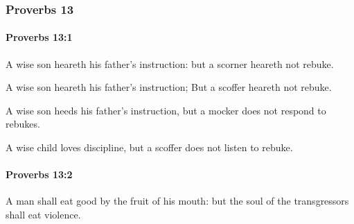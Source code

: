 	\subsubsection{Proverbs 13} %
		\label{PROVERBS-13}

		\paragraph{Proverbs 13:1} %
			\label{PROVERBS-13-1}

			A wise son heareth his father’s instruction: but a scorner heareth not rebuke.

			\begin{versebox}
					\item[BHS] 
					\item[ASV] A wise son heareth his father's instruction; But a scoffer heareth not rebuke.
					\item[NIV] A wise son heeds his father’s instruction, but a mocker does not respond to rebukes.
					\item[NRSV] A wise child loves discipline, but a scoffer does not listen to rebuke.
			\end{versebox}

		\paragraph{Proverbs 13:2} %
			\label{PROVERBS-13-2}

			A man shall eat good by the fruit of his mouth: but the soul of the transgressors shall eat violence.

